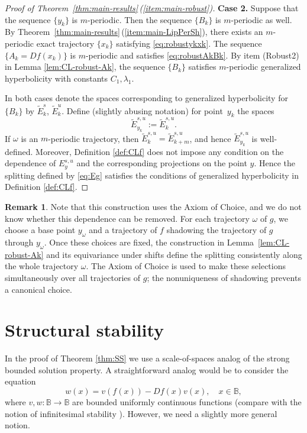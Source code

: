 \documentclass[12pt]{article}
\newcommand{\Bb}{\mathbb{B}}
\theoremstyle{definition}
\newtheorem{remark}[thm]{Remark}
\begin{document}
\begin{proof}[Proof of Theorem~\ref{thm:main-results}\,(\ref{item:main-robust})]
\textbf{Case 2.} Suppose that the sequence $\{y_{k}\}$ is $m$-periodic. Then the sequence $\{B_k\}$ is $m$-periodic as well. By Theorem~\ref{thm:main-results}\,(\ref{item:main-LipPerSh}), there exists an $m$-periodic exact trajectory $\{x_k\}$ satisfying \eqref{eq:robustykxk}. The sequence $\{A_k = Df(x_k)\}$ is $m$-periodic and satisfies \eqref{eq:robustAkBk}. By item (Robust2) in Lemma \ref{lem:CL-robust-Ak}, the sequence $\{B_k\}$ satisfies $m$-periodic generalized hyperbolicity with constants $C_1, \lambda_1$. 

In both cases denote the spaces corresponding to generalized hyperbolicity for $\{B_k\}$ by $\tilde{E}_k^s$, $\tilde{E}_k^u$. Define (slightly abusing notation) for point~$y_k$ the spaces 
\begin{equation}\label{eq:Eg}
    \tilde{E}_{y_k}^{s, u} := \tilde{E}_k^{s, u}.    
\end{equation}
If $\omega$ is an $m$-periodic trajectory, then $\tilde{E}_k^{s, u} = \tilde{E}_{k+m}^{s, u}$, and hence $\tilde{E}_{y_k}^{s, u}$ is well-defined. Moreover, Definition \ref{def:CLf} does not impose any condition on the dependence of $E_y^{s, u}$ and the corresponding projections on the point $y$. Hence the splitting defined by \eqref{eq:Eg} satisfies the conditions of generalized hyperbolicity in Definition \ref{def:CLf}. 
\end{proof}
\begin{remark}\label{rem:AoC}
Note that this construction uses the Axiom of Choice, and we do not know whether this dependence can be removed. For each trajectory $\omega$ of $g$, we choose a base point $y_\omega$ and a trajectory of $f$ shadowing the trajectory of $g$ through $y_\omega$. Once these choices are fixed, the construction in Lemma~\ref{lem:CL-robust-Ak} and its equivariance under shifts define the splitting consistently along the whole trajectory $\omega$. The Axiom of Choice is used to make these selections simultaneously over all trajectories of $g$; the nonuniqueness of shadowing prevents a canonical choice.
\end{remark}


\section{Structural stability}\label{sec:SS}

In the proof of Theorem \ref{thm:SS} we use a scale-of-spaces analog of the strong bounded solution property. A straightforward analog would be to consider the equation
$$
w(x) = v(f(x)) - Df(x)v(x), \quad x \in \Bb,
$$
where $v, w: \Bb \to \Bb$ are bounded uniformly continuous functions (compare with the notion of infinitesimal stability \cite{Mane1977}). However, we need a slightly more general notion.
\end{document}
